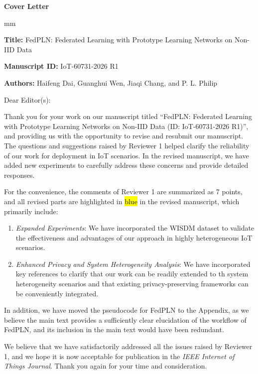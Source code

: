 \documentclass[a4paper,12pt]{article}
\newcommand{\hlb}[1]{\sethlcolor{b}\hl{#1}}
\begin{document}
\centerline{\Large \bf Cover Letter}
 mm

\medskip

\noindent
\textbf{Title:} {FedPLN: Federated Learning with Prototype Learning Networks on Non-IID Data}

\medskip

\noindent
\textbf{Manuscript ID:} {IoT-60731-2026 R1}

\medskip

\noindent
\textbf{Authors:} {Haifeng Dai, Guanghui Wen, Jiaqi Chang, and P. L. Philip}

\bigskip

\bigskip

\noindent
Dear Editor(s):

\bigskip

Thank you for your work on our manuscript titled ``FedPLN: Federated Learning with Prototype Learning Networks on Non-IID Data (ID: IoT-60731-2026 R1)'', and providing us with the opportunity to revise and resubmit our manuscript. The questions and suggestions raised by Reviewer 1 helped clarify the reliability of our work for deployment in IoT scenarios. In the revised manuscript, we have added new experiments to carefully address these concerns and provide detailed responses.

\medskip

For the convenience, the comments of Reviewer 1 are summarized as 7 points, and all revised parts are highlighted in \hlb{blue} in the revised manuscript, which primarily include:
\begin{enumerate}
    \item \textit{Expanded Experiments}: We have incorporated the WISDM dataset to validate the effectiveness and advantages of our approach in highly heterogeneous IoT scenarios.
    \item \textit{Enhanced Privacy and System Heterogeneity Analysis}: We have incorporated key references to clarify that our work can be readily extended to th system heterogeneity scenarios and that existing privacy-preserving frameworks can be conveniently integrated.
\end{enumerate}

\noindent
In addition, we have moved the pseudocode for FedPLN to the Appendix, as we believe the main text provides a sufficiently clear elucidation of the workflow of FedPLN, and its inclusion in the main text would have been redundant.

\medskip

We believe that we have satisfactorily addressed all the issues raised by Reviewer 1, and we hope it is now acceptable for publication in the \textit{IEEE Internet of Things Journal}.
Thank you again for your time and consideration.
\end{document}
